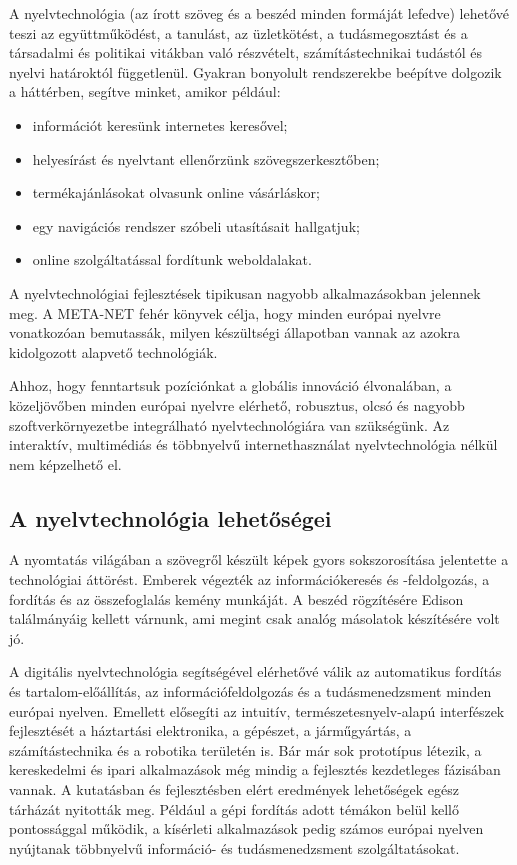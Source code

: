 \begin{multicols}{2}
  A nyelvtechnológia (az írott szöveg és a beszéd minden formáját lefedve) lehetővé teszi az együttműködést, a tanulást, az üzletkötést, a tudásmegosztást és a társadalmi és politikai vitákban való rész\-vé\-telt, számítástechnikai tudástól és nyelvi határoktól függetlenül. Gyakran bo\-nyo\-lult rendszerekbe beépítve dolgozik a háttérben, segítve minket, amikor például:

  \begin{itemize}
  \item információt keresünk internetes ke\-re\-ső\-vel;
  \item helyesírást és nyelvtant ellenőrzünk szövegszerkesztőben;
  \item termékajánlásokat olvasunk online vásárláskor;
  \item egy navigációs rendszer szóbeli uta\-sí\-tá\-sait hallgatjuk;
  \item online szolgáltatással fordítunk web\-oldalakat.
  \end{itemize}

  A nyelvtechnológiai fejlesztések tipikusan nagyobb alkalmazásokban jelennek meg. A META-NET fehér könyvek célja, hogy minden európai nyelvre vonatkozóan bemutassák, milyen készültségi állapotban vannak az azokra kidolgozott alapvető technológiák.


  Ahhoz, hogy fenntartsuk pozíciónkat a globális innováció élvonalában, a kö\-zel\-jö\-vő\-ben minden európai nyelvre elérhető, robusztus, olcsó és nagyobb szoft\-ver\-kör\-nye\-zet\-be integrálható nyelvtechnológiára van szükségünk. Az interaktív, multimédiás és többnyelvű internethasználat nyelvtechnológia nélkül nem képzelhető el. 

  \subsection{A nyelvtechnológia lehetőségei}

  A nyomtatás világában a szövegről készült képek gyors sokszorosítása jelentette a technológiai áttörést. Emberek végezték az információkeresés és -feldolgozás, a fordítás és az összefoglalás kemény mun\-ká\-ját. A beszéd rögzítésére Edison ta\-lál\-má\-nyá\-ig kellett várnunk, ami megint csak analóg másolatok készítésére volt jó. 

  A digitális nyelvtechnológia segítségével elérhetővé válik az automatikus fordítás és tartalom-előállítás, az információfeldolgozás és a tudásmenedzsment minden európai nyelven. Emellett elősegíti az intuitív, természetesnyelv-alapú interfészek fejlesztését a háztartási elektronika, a gépészet, a járműgyártás, a számítástechnika és a robotika területén is. Bár már sok prototípus létezik, a kereskedelmi és ipari alkalmazások még mindig a fejlesztés kezdetleges fázisában vannak. A kutatásban és fejlesztésben elért eredmények lehetőségek egész tárházát nyitották meg. Például a gépi fordítás adott témákon belül kellő pontossággal működik, a kísérleti alkalmazások pedig számos európai nyelven nyújtanak többnyelvű információ- és tudásmenedzsment szolgáltatásokat. 


\end{multicols}
